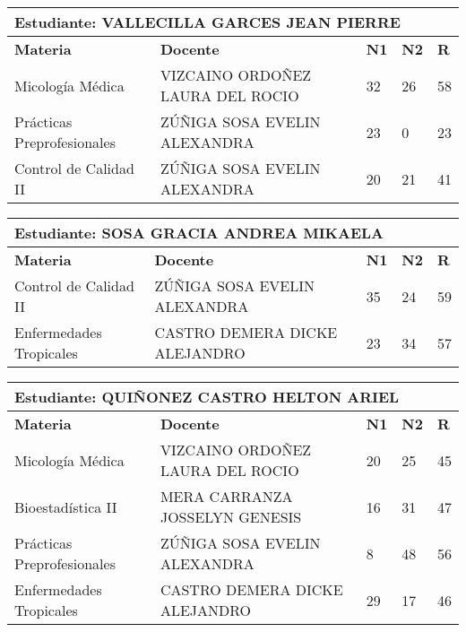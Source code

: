 \begin{tabularx}{\textwidth}{|p{5cm}|p{7cm}|X|X|X|}
\hline
\multicolumn{5}{|p{\dimexpr\textwidth-2\tabcolsep-2\arrayrulewidth}|}{\textbf{Estudiante: VALLECILLA GARCES JEAN PIERRE }}\\\hline
\textbf{Materia} & \textbf{Docente} & \textbf{N1} & \textbf{N2} & \textbf{R} \\ \hline
Micología Médica & VIZCAINO ORDOÑEZ LAURA DEL ROCIO   & 32 & 26& 58 \\ \hline
Prácticas Preprofesionales & ZÚÑIGA SOSA EVELIN ALEXANDRA  & 23 & 0& 23 \\ \hline
Control de Calidad II & ZÚÑIGA SOSA EVELIN ALEXANDRA  & 20 & 21& 41 \\ \hline
\end{tabularx}\vspace{10mm}
\small
\begin{tabularx}{\textwidth}{|p{5cm}|p{7cm}|X|X|X|}
\hline
\multicolumn{5}{|p{\dimexpr\textwidth-2\tabcolsep-2\arrayrulewidth}|}{\textbf{Estudiante: SOSA GRACIA ANDREA MIKAELA }}\\\hline
\textbf{Materia} & \textbf{Docente} & \textbf{N1} & \textbf{N2} & \textbf{R} \\ \hline
Control de Calidad II & ZÚÑIGA SOSA EVELIN ALEXANDRA  & 35 & 24& 59 \\ \hline
Enfermedades Tropicales & CASTRO DEMERA DICKE ALEJANDRO  & 23 & 34& 57 \\ \hline
\end{tabularx}\vspace{10mm}
\small
\begin{tabularx}{\textwidth}{|p{5cm}|p{7cm}|X|X|X|}
\hline
\multicolumn{5}{|p{\dimexpr\textwidth-2\tabcolsep-2\arrayrulewidth}|}{\textbf{Estudiante: QUIÑONEZ CASTRO HELTON ARIEL }}\\\hline
\textbf{Materia} & \textbf{Docente} & \textbf{N1} & \textbf{N2} & \textbf{R} \\ \hline
Micología Médica & VIZCAINO ORDOÑEZ LAURA DEL ROCIO   & 20 & 25& 45 \\ \hline
Bioestadística II & MERA CARRANZA JOSSELYN GENESIS  & 16 & 31& 47 \\ \hline
Prácticas Preprofesionales & ZÚÑIGA SOSA EVELIN ALEXANDRA  & 8 & 48& 56 \\ \hline
Enfermedades Tropicales & CASTRO DEMERA DICKE ALEJANDRO  & 29 & 17& 46 \\ \hline
\end{tabularx}\vspace{10mm}
\small

